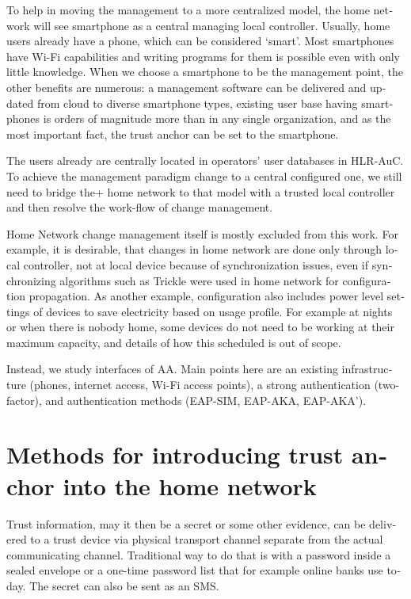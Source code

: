 \documentclass[12pt,a4paper,english]{tutthesis}
\begin{document}
\begin{otherlanguage}{english}
To help in moving the management to a more centralized
model, the home network will see smartphone as a central managing local
controller.
Usually, home users already have a phone, which can be considered 
`smart'. Most smartphones have Wi-Fi capabilities and writing programs
for them is possible even with only little knowledge.
When we choose a smartphone to be the management point, the other benefits are
numerous:  a management software can be delivered and
updated from cloud to diverse smartphone types, existing user
base having smartphones is orders of magnitude more than in any single
organization, and as the most important fact, the trust anchor can be set to the smartphone.

The users already are  centrally located  in operators' user databases
in HLR-AuC.  To achieve the management paradigm change to a central configured one,
we still need to bridge the+ home network to that model with a trusted local controller
and then resolve the work-flow of change management.


Home Network change management itself is mostly excluded from this work.
For example, 
it is desirable, that changes in home network are done only through
local controller, not at local device because of
synchronization issues, even 
if synchronizing algorithms such as Trickle\cite{rfc6206} were used in
home network for configuration propagation. As another example,
configuration also includes
power level settings of devices to save electricity based on usage
profile. For example at nights or when there is nobody home, some
devices do not need to be working at their maximum capacity, and
details of how this scheduled is out of scope.

Instead, we study interfaces of AA.  Main points here are an existing
infrastructure (phones, internet access, Wi-Fi access points),  a strong
authentication (two-factor), and authentication methods
(EAP-SIM, EAP-AKA, EAP-AKA').

\section{Methods for introducing trust anchor into the home network}
\label{sec-3-3}
\label{sec:altmethods}

 Trust information, may it then be a secret or some
other evidence, can be delivered to a trust device via physical
transport channel separate from the actual communicating channel.
Traditional way to do that is with a password inside a sealed
envelope or a one-time password list that for example online banks 
use today. The secret can also be sent as an SMS.


\end{otherlanguage}
\end{document}
